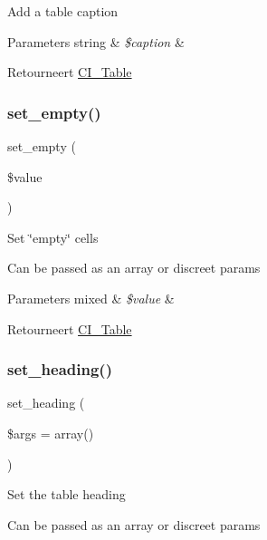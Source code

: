 Add a table caption


\begin{DoxyParams}[1]{Parameters}
string & {\em \$caption} & \\
\hline
\end{DoxyParams}
\begin{DoxyReturn}{Retourneert}
\mbox{\hyperlink{class_c_i___table}{C\+I\+\_\+\+Table}} 
\end{DoxyReturn}
\mbox{\label{class_c_i___table_a20b008428100a2b740c02c4bcaa45cf6}} 
\subsubsection{\texorpdfstring{set\_empty()}{set\_empty()}}
{\footnotesize\ttfamily set\+\_\+empty (\begin{DoxyParamCaption}\item[{}]{\$value }\end{DoxyParamCaption})}

Set \char`\"{}empty\char`\"{} cells

Can be passed as an array or discreet params


\begin{DoxyParams}[1]{Parameters}
mixed & {\em \$value} & \\
\hline
\end{DoxyParams}
\begin{DoxyReturn}{Retourneert}
\mbox{\hyperlink{class_c_i___table}{C\+I\+\_\+\+Table}} 
\end{DoxyReturn}
\mbox{\label{class_c_i___table_ac35607094955ce966330d6af51d221ef}} 
\subsubsection{\texorpdfstring{set\_heading()}{set\_heading()}}
{\footnotesize\ttfamily set\+\_\+heading (\begin{DoxyParamCaption}\item[{}]{\$args = {\ttfamily array()} }\end{DoxyParamCaption})}

Set the table heading

Can be passed as an array or discreet params


